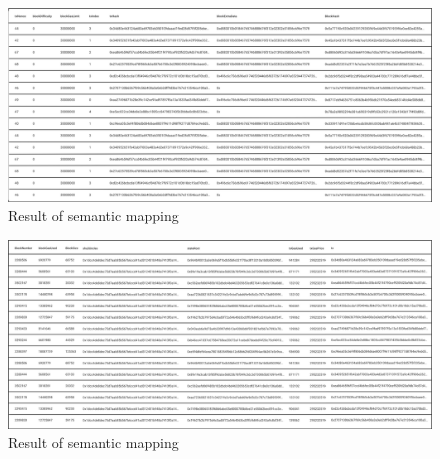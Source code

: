 \begin{center}
	\begin{figure}[htb!]
		
		\begin{minipage}{0.55\linewidth}
			\centering
			\includegraphics[width=1.95\textwidth]{images/chap03_licese_result_1.png}
		\end{minipage}
		\caption[Result of semantic mapping]{Result of semantic mapping}
		
	\end{figure}
	
\end{center}
\begin{center}
	\begin{figure}[htb!]
		
		\begin{minipage}{0.55\linewidth}
			\centering
			\includegraphics[width=1.95\textwidth]{images/chap03_licese_result_2.png}
		\end{minipage}
		\caption[Result of semantic mapping]{Result of semantic mapping}
		
	\end{figure}
	
\end{center}
